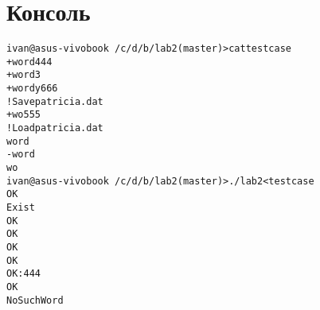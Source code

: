 \section{Консоль}
\begin{alltt}
ivan@asus-vivobook ~/c/d/b/lab2 (master)> cat testcase
+ word 444
+ word 3
+ wordy 666
! Save patricia.dat
+ wo 555
! Load patricia.dat
word
- word
wo
ivan@asus-vivobook ~/c/d/b/lab2 (master)> ./lab2 < testcase
OK
Exist
OK
OK
OK
OK
OK: 444
OK
NoSuchWord
\end{alltt}
\pagebreak

